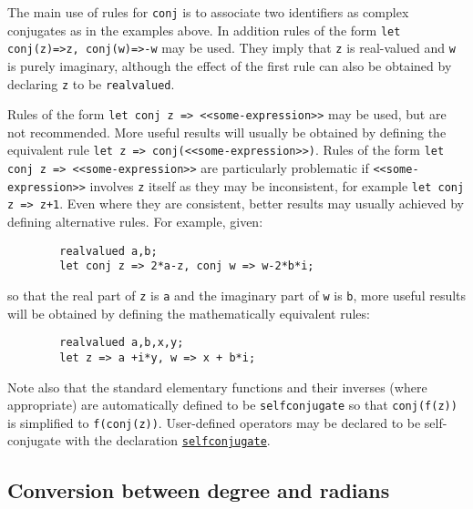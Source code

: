 The main use of rules for \texttt{conj} is to associate two identifiers
as complex conjugates as in the examples above. In addition rules of the form
\texttt{let conj(z)=>z, conj(w)=>-w} may be used. They imply that
\texttt{z} is real-valued and \texttt{w} is purely imaginary, although
the effect of the first rule can also be obtained by declaring \texttt{z}
to be \texttt{realvalued}.

Rules of the form \texttt{let conj z => <<some-expression>>} may be used,
but are not recommended. More useful results will usually be obtained by
defining the equivalent rule \texttt{let z => conj(<<some-expression>>)}.
Rules of the form \texttt{let conj z => <<some-expression>>} are particularly
problematic if \texttt{<<some-expression>>} involves \texttt{z} itself as
they may be inconsistent, for example \texttt{let conj z => z+1}. Even where
they are consistent, better results may usually achieved by defining alternative rules.
For example, given:
\begin{verbatim}
        realvalued a,b;
        let conj z => 2*a-z, conj w => w-2*b*i;
\end{verbatim}
so that the real part of \texttt{z} is \texttt{a} and the imaginary part
of \texttt{w} is \texttt{b}, more useful results will be obtained by
defining the mathematically equivalent rules:
\begin{verbatim}
        realvalued a,b,x,y;
        let z => a +i*y, w => x + b*i;
\end{verbatim}

Note also that the standard elementary functions and their inverses
(where appropriate) are automatically defined to be
\texttt{selfconjugate} so that
\texttt{conj(f(z))} is simplified to \texttt{f(conj(z))}. User-defined
operators may be declared to be self-conjugate with the declaration
\hyperlink{command:SELFCONJUGATE}{\texttt{selfconjugate}}.

\subsection{Conversion between degree and radians}
\hypertarget{operator:DEG2RAD}{}
\hypertarget{operator:RAD2DEG}{}
\hypertarget{operator:DEG2DMS}{}
\hypertarget{operator:RAD2DMS}{}
\hypertarget{operator:DMS2RAD}{}
\hypertarget{operator:DMS2DEG}{}

